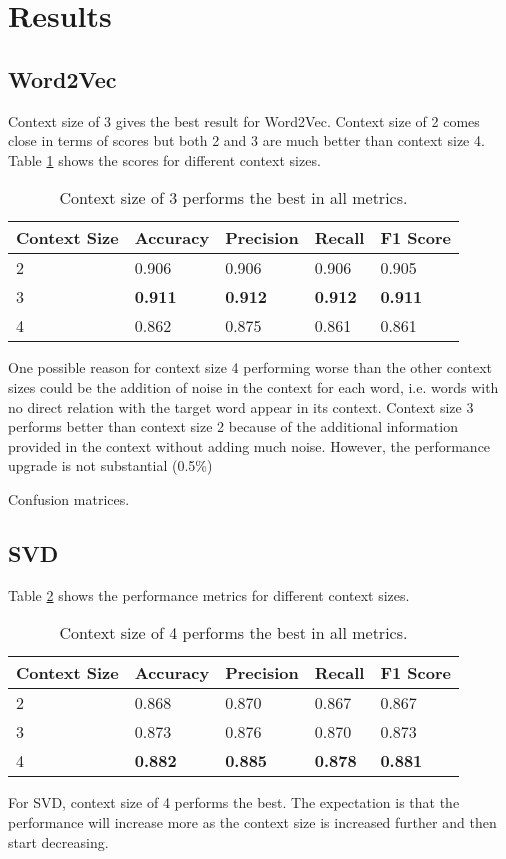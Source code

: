 \documentclass[a4paper,9pt]{report}
\begin{document}
\section*{Results}
\subsection*{Word2Vec}
Context size of 3 gives the best result for Word2Vec. 
Context size of 2 comes close in terms of scores but both 2 and 3 are much better than context size 4.
Table \ref{tab:word2vec} shows the scores for different context sizes.
\begin{table}[H]
    \centering
    \begin{tabular}{|l|l|l|l|l|}
        \hline
        \textbf{Context Size} & \textbf{Accuracy} & \textbf{Precision} & \textbf{Recall} & \textbf{F1 Score} \\ \hline
        2 & 0.906 & 0.906 & 0.906 & 0.905 \\
        3 & \textbf{0.911} & \textbf{0.912} & \textbf{0.912} & \textbf{0.911} \\
        4 & 0.862 & 0.875 & 0.861 & 0.861 \\
        \hline
    \end{tabular}
    \caption{Context size of 3 performs the best in all metrics.}
    \label{tab:word2vec}
\end{table} 
One possible reason for context size 4 performing worse than the other context sizes could be the addition of noise in the context for each word, i.e. words with no direct relation with the target word appear in its context. 
Context size 3 performs better than context size 2 because of the additional information provided in the context without adding much noise. However, the performance upgrade is not substantial (0.5\%)

Confusion matrices.
\subsection*{SVD}
Table \ref{tab:svd} shows the performance metrics for different context sizes. 
\begin{table}[H]
    \centering
    \begin{tabular}{|l|l|l|l|l|}
        \hline
        \textbf{Context Size} & \textbf{Accuracy} & \textbf{Precision} & \textbf{Recall} & \textbf{F1 Score} \\ \hline
        2 & 0.868 & 0.870 & 0.867 & 0.867 \\
        3 & 0.873 & 0.876 & 0.870 & 0.873 \\
        4 & \textbf{0.882} & \textbf{0.885} & \textbf{0.878} & \textbf{0.881} \\
        \hline
    \end{tabular}
    \caption{Context size of 4 performs the best in all metrics.}
    \label{tab:svd}
\end{table}
For SVD, context size of 4 performs the best. The expectation is that the performance will increase more as the context size is increased further and then start decreasing.
\end{document}
